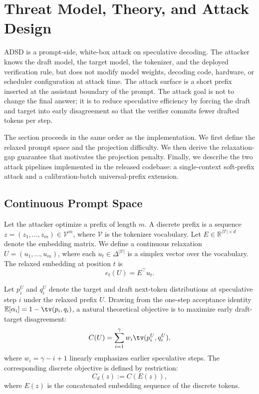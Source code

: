 \section{Threat Model, Theory, and Attack Design}

ADSD is a prompt-side, white-box attack on speculative decoding. The attacker
knows the draft model, the target model, the tokenizer, and the deployed
verification rule, but does not modify model weights, decoding code, hardware,
or scheduler configuration at attack time. The attack surface is a short prefix
inserted at the assistant boundary of the prompt. The attack goal is not to
change the final answer; it is to reduce speculative efficiency by forcing the
draft and target into early disagreement so that the verifier commits fewer
drafted tokens per step.

The section proceeds in the same order as the implementation. We first define
the relaxed prompt space and the projection difficulty. We then derive the
relaxation-gap guarantee that motivates the projection penalty. Finally, we
describe the two attack pipelines implemented in the released codebase: a
single-context soft-prefix attack and a calibration-batch universal-prefix
extension.

\subsection{Continuous Prompt Space}

Let the attacker optimize a prefix of length $m$. A discrete prefix is a
sequence $z = (z_1, \dots, z_m) \in \mathcal{V}^m$, where $\mathcal{V}$ is the
tokenizer vocabulary. Let $E \in \mathbb{R}^{|\mathcal{V}| \times d}$ denote
the embedding matrix. We define a continuous relaxation
$U = (u_1, \dots, u_m)$, where each $u_t \in \Delta^{|\mathcal{V}|}$ is a
simplex vector over the vocabulary. The relaxed embedding at position $t$ is
\[
e_t(U) = E^\top u_t.
\]

Let $p_i^U$ and $q_i^U$ denote the target and draft next-token distributions at
speculative step $i$ under the relaxed prefix $U$. Drawing from the one-step
acceptance identity $\mathbb{E}[\alpha_i] = 1 - \tv(p_i, q_i)$, a natural
theoretical objective is to maximize early draft-target disagreement:
\[
C(U) = \sum_{i=1}^{\gamma} w_i \tv(p_i^U, q_i^U),
\]
where $w_i = \gamma - i + 1$ linearly emphasizes earlier speculative steps.
The corresponding discrete objective is defined by restriction:
\[
C_d(z) := C(E(z)),
\]
where $E(z)$ is the concatenated embedding sequence of the discrete tokens.

